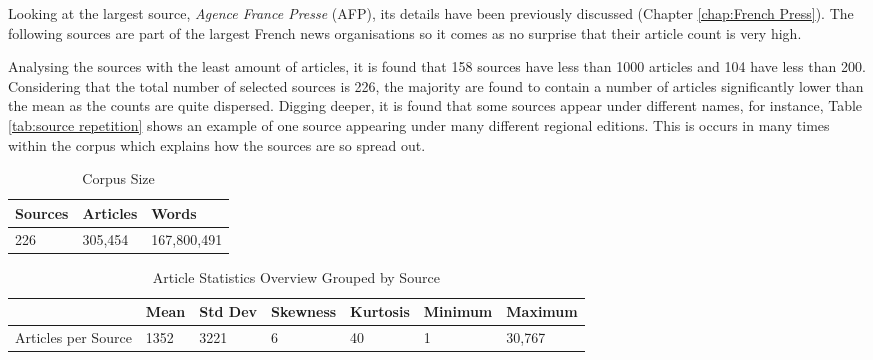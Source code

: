 Looking at the largest source, \emph{Agence France Presse} (AFP), its details have been previously discussed (Chapter \ref{chap:French Press}). The following sources are part of the largest French news organisations so it comes as no surprise that their article count is very high.

Analysing the sources with the least amount of articles, it is found that 158 sources have less than 1000 articles and 104 have less than 200. Considering that the total number of selected sources is 226, the majority are found to contain a number of articles significantly lower than the mean as the counts are quite dispersed. Digging deeper, it is found that some sources appear under different names, for instance, Table \ref{tab:source repetition} shows an example of one source appearing under many different regional editions. This is occurs in many times within the corpus which explains how the sources are so spread out. 

\begin{table}[H]
\centering
\begin{tabular}{lll}
\toprule
Sources & Articles & Words \\ \hline
226 & 305,454 & 167,800,491 \\
\bottomrule
\end{tabular}
\caption{Corpus Size}
\label{tab: corpus size}
\end{table}

\begin{table}[H]
\centering
\begin{tabular}{@{}lllllll@{}}
\toprule
 & Mean & Std Dev & Skewness & Kurtosis & Minimum & Maximum \\ \midrule
Articles per Source & 1352 & 3221 & 6 & 40 & 1 & 30,767 \\ \bottomrule
\end{tabular}
\caption{Article Statistics Overview Grouped by Source}
\label{tab:core stat source}
\end{table}


